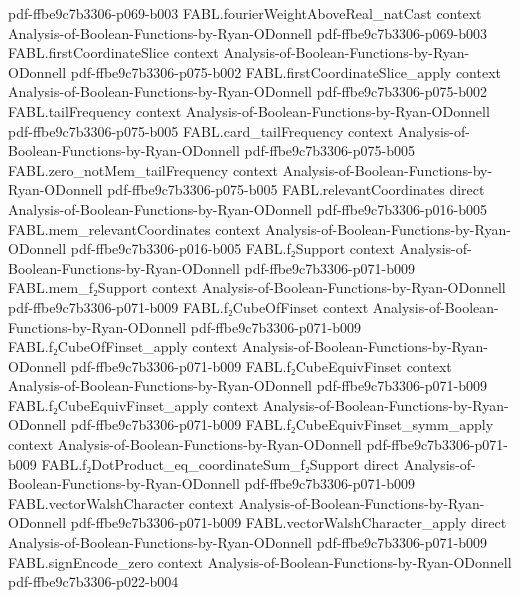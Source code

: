 \begin{theorem}
  {pdf-ffbe9c7b3306-p069-b003}
\proofstep
  {FABL.fourierWeightAboveReal_natCast}
  {context}
  {Analysis-of-Boolean-Functions-by-Ryan-ODonnell}
  {pdf-ffbe9c7b3306-p069-b003}
\proofstep
  {FABL.firstCoordinateSlice}
  {context}
  {Analysis-of-Boolean-Functions-by-Ryan-ODonnell}
  {pdf-ffbe9c7b3306-p075-b002}
\proofstep
  {FABL.firstCoordinateSlice_apply}
  {context}
  {Analysis-of-Boolean-Functions-by-Ryan-ODonnell}
  {pdf-ffbe9c7b3306-p075-b002}
\proofstep
  {FABL.tailFrequency}
  {context}
  {Analysis-of-Boolean-Functions-by-Ryan-ODonnell}
  {pdf-ffbe9c7b3306-p075-b005}
\proofstep
  {FABL.card_tailFrequency}
  {context}
  {Analysis-of-Boolean-Functions-by-Ryan-ODonnell}
  {pdf-ffbe9c7b3306-p075-b005}
\proofstep
  {FABL.zero_notMem_tailFrequency}
  {context}
  {Analysis-of-Boolean-Functions-by-Ryan-ODonnell}
  {pdf-ffbe9c7b3306-p075-b005}
\proofstep
  {FABL.relevantCoordinates}
  {direct}
  {Analysis-of-Boolean-Functions-by-Ryan-ODonnell}
  {pdf-ffbe9c7b3306-p016-b005}
\proofstep
  {FABL.mem_relevantCoordinates}
  {context}
  {Analysis-of-Boolean-Functions-by-Ryan-ODonnell}
  {pdf-ffbe9c7b3306-p016-b005}
\proofstep
  {FABL.f₂Support}
  {context}
  {Analysis-of-Boolean-Functions-by-Ryan-ODonnell}
  {pdf-ffbe9c7b3306-p071-b009}
\proofstep
  {FABL.mem_f₂Support}
  {context}
  {Analysis-of-Boolean-Functions-by-Ryan-ODonnell}
  {pdf-ffbe9c7b3306-p071-b009}
\proofstep
  {FABL.f₂CubeOfFinset}
  {context}
  {Analysis-of-Boolean-Functions-by-Ryan-ODonnell}
  {pdf-ffbe9c7b3306-p071-b009}
\proofstep
  {FABL.f₂CubeOfFinset_apply}
  {context}
  {Analysis-of-Boolean-Functions-by-Ryan-ODonnell}
  {pdf-ffbe9c7b3306-p071-b009}
\proofstep
  {FABL.f₂CubeEquivFinset}
  {context}
  {Analysis-of-Boolean-Functions-by-Ryan-ODonnell}
  {pdf-ffbe9c7b3306-p071-b009}
\proofstep
  {FABL.f₂CubeEquivFinset_apply}
  {context}
  {Analysis-of-Boolean-Functions-by-Ryan-ODonnell}
  {pdf-ffbe9c7b3306-p071-b009}
\proofstep
  {FABL.f₂CubeEquivFinset_symm_apply}
  {context}
  {Analysis-of-Boolean-Functions-by-Ryan-ODonnell}
  {pdf-ffbe9c7b3306-p071-b009}
\proofstep
  {FABL.f₂DotProduct_eq_coordinateSum_f₂Support}
  {direct}
  {Analysis-of-Boolean-Functions-by-Ryan-ODonnell}
  {pdf-ffbe9c7b3306-p071-b009}
\proofstep
  {FABL.vectorWalshCharacter}
  {context}
  {Analysis-of-Boolean-Functions-by-Ryan-ODonnell}
  {pdf-ffbe9c7b3306-p071-b009}
\proofstep
  {FABL.vectorWalshCharacter_apply}
  {direct}
  {Analysis-of-Boolean-Functions-by-Ryan-ODonnell}
  {pdf-ffbe9c7b3306-p071-b009}
\proofstep
  {FABL.signEncode_zero}
  {context}
  {Analysis-of-Boolean-Functions-by-Ryan-ODonnell}
  {pdf-ffbe9c7b3306-p022-b004}

\end{theorem}

